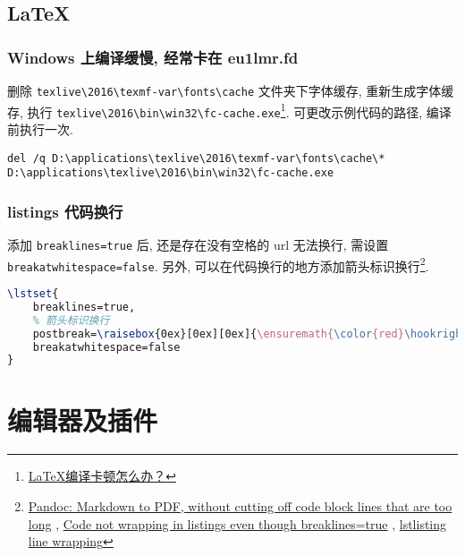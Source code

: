 \subsection{LaTeX}\label{latex}

\subsubsection{Windows 上编译缓慢, 经常卡在
eu1lmr.fd}\label{windows-ux4e0aux7f16ux8bd1ux7f13ux6162-ux7ecfux5e38ux5361ux5728-eu1lmr.fd}

删除 \lstinline!texlive\2016\texmf-var\fonts\cache! 文件夹下字体缓存,
重新生成字体缓存, 执行
\lstinline!texlive\2016\bin\win32\fc-cache.exe!\footnote{\href{https://www.zhihu.com/question/51999238/answer/135852542}{LaTeX编译卡顿怎么办？}}.
可更改示例代码的路径, 编译前执行一次.

\begin{lstlisting}
del /q D:\applications\texlive\2016\texmf-var\fonts\cache\*
D:\applications\texlive\2016\bin\win32\fc-cache.exe
\end{lstlisting}

\subsubsection{listings
代码换行}\label{listings-ux4ee3ux7801ux6362ux884c}

添加 \lstinline!breaklines=true! 后, 还是存在没有空格的 url 无法换行,
需设置 \lstinline!breakatwhitespace=false!. 另外,
可以在代码换行的地方添加箭头标识换行\footnote{\href{http://tex.stackexchange.com/questions/179926/pandoc-markdown-to-pdf-without-cutting-off-code-block-lines-that-are-too-long}{Pandoc:
  Markdown to PDF, without cutting off code block lines that are too
  long} ,
  \href{http://tex.stackexchange.com/questions/174569/code-not-wrapping-in-listings-even-though-breaklines-true}{Code
  not wrapping in listings even though breaklines=true} ,
  \href{http://tex.stackexchange.com/questions/116534/lstlisting-line-wrapping}{lstlisting
  line wrapping}}.

\begin{lstlisting}[language=TeX]
\lstset{
    breaklines=true,
    % 箭头标识换行
    postbreak=\raisebox{0ex}[0ex][0ex]{\ensuremath{\color{red}\hookrightarrow\space}},
    breakatwhitespace=false
}
\end{lstlisting}

\section{编辑器及插件}\label{ux7f16ux8f91ux5668ux53caux63d2ux4ef6}

